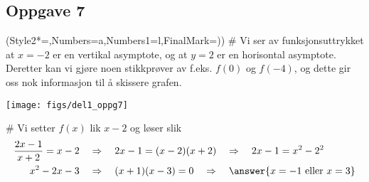 \subsection*{Oppgave 7}
\begin{easylist}[enumerate]
	\ListProperties(Style2*=,Numbers=a,Numbers1=l,FinalMark={)})
	# Vi ser av funksjonsuttrykket at $x = -2$ er en vertikal asymptote, og at $y = 2$ er en horisontal asymptote. Deretter kan vi gjøre noen stikkprøver av f.eks. $f(0)$ og $f(-4)$, og dette gir oss nok informasjon til å skissere grafen.
	\begin{center}
		\texttt{[image: figs/del1\_oppg7]}
	\end{center}
	
	# Vi setter $f(x)$ lik $x-2$ og løser slik
	\begin{align*}
		\frac{2x - 1}{x + 2} = x - 2 &\quad \Rightarrow \quad 2x - 1 = (x-2)(x+2) \quad \Rightarrow \quad 2x - 1 = x^2 - 2^2 \\
		x^2 - 2x - 3  &\quad \Rightarrow \quad (x+1)(x-3) = 0 \quad \Rightarrow \quad
		\answer{x = -1 \text{ eller } x=3}
	\end{align*}
\end{easylist}

